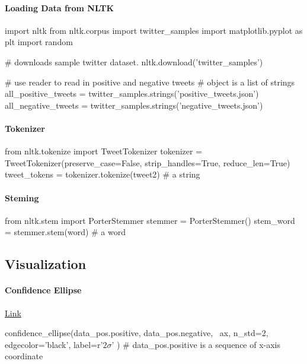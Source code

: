 \paragraph{Loading Data from NLTK} \mbox{}
\begin{python}
import nltk                             
from nltk.corpus import twitter_samples  
import matplotlib.pyplot as plt
import random      

# downloads sample twitter dataset.
nltk.download('twitter_samples')

# use reader to read in positive and negative tweets
# object is a list of strings
all_positive_tweets = twitter_samples.strings('positive_tweets.json')
all_negative_tweets = twitter_samples.strings('negative_tweets.json')
\end{python}

\paragraph{Tokenizer} \mbox{}

\begin{python}
from nltk.tokenize import TweetTokenizer 
tokenizer = TweetTokenizer(preserve_case=False, strip_handles=True,
                               reduce_len=True)
tweet_tokens = tokenizer.tokenize(tweet2) # a string
\end{python}

\paragraph{Steming} \mbox{}
\begin{python}
from nltk.stem import PorterStemmer    
stemmer = PorterStemmer()
stem_word = stemmer.stem(word)  # a word
\end{python}

\subsection{Visualization}
\paragraph{Confidence Ellipse} \href{https://matplotlib.org/stable/gallery/statistics/confidence_ellipse.html}{Link} \mbox{}
\begin{python}
confidence_ellipse(data_pos.positive, data_pos.negative, \
    ax, n_std=2, edgecolor='black', label=r'$2\sigma$' )
# data_pos.positive is a sequence of x-axis coordinate
\end{python}





